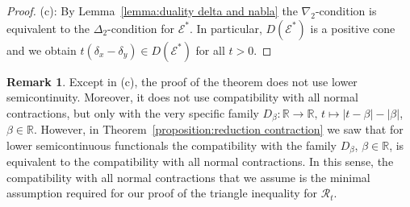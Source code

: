 \documentclass[a4paper,11pt,reqno]{amsart}
\theoremstyle{definition}
\newtheorem{remark}[lemma]{Remark}
\numberwithin{equation}{section}
\newcommand{\cR}{{\mathcal R}}
\newcommand{\cE}{{\mathcal E}}
\newcommand{\R}{{\mathbb R}}
\newcommand{\1}{\mathds{1}}
\begin{document}
\begin{proof}
(c): By  Lemma~\ref{lemma:duality delta and nabla} the $\nabla_2$-condition is equivalent to the $\Delta_2$-condition for $\cE^*$. In particular, $D(\cE^*)$ is a positive cone and we obtain $t (\delta_x - \delta_y) \in D(\cE^*)$ for all $t > 0$. 
%  
%  
%  
%  
%  
%  
%  
\end{proof}

\begin{remark}\label{remark:triangle inequality and contractions}
  Except in (c), the proof of the theorem does not use lower semicontinuity. Moreover, it does not use compatibility with all normal contractions, but only with the very specific family $D_\beta \colon \R \to \R, \, t \mapsto |t - \beta| - |\beta|$, $\beta \in \R$. However, in Theorem~\ref{proposition:reduction contraction} we saw that for lower semicontinuous functionals the compatibility with the family $D_\beta$, $\beta \in \R$, is equivalent to the compatibility with all normal contractions. In this sense, the compatibility with all normal contractions that we assume is the minimal assumption required for our proof of the triangle inequality for $\cR_t$.
  \end{remark}
\end{document}
